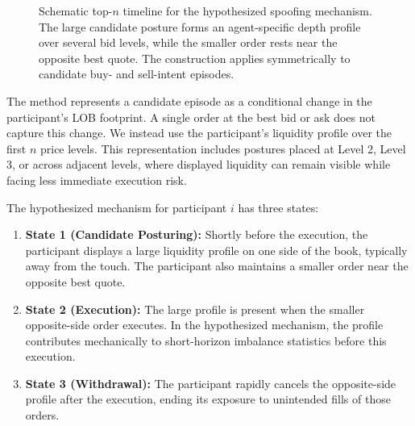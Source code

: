 \documentclass[11pt]{article}
\begin{document}
\begin{figure}[htbp]
{%
    }
    \caption{Schematic top-$n$ timeline for the hypothesized spoofing mechanism. The large candidate posture forms an
    agent-specific depth profile over several bid levels, while the smaller order rests near the opposite best quote. The
    construction applies symmetrically to candidate buy- and sell-intent episodes.}
    \label{fig:topn_spoofing_timeline}
\end{figure}

The method represents a candidate episode as a conditional change in the participant's LOB footprint. A single order at
the best bid or ask does not capture this change. We instead use the participant's liquidity profile over the first $n$
price levels. This representation includes postures placed at Level 2, Level 3, or across adjacent levels, where displayed
liquidity can remain visible while facing less immediate execution risk.

The hypothesized mechanism for participant $i$ has three states:
\begin{enumerate}
    \item \textbf{State 1 (Candidate Posturing):} Shortly before the execution, the participant displays a large
    liquidity profile on one side of the book, typically away from the touch. The participant also maintains a smaller
    order near the opposite best quote.
    \item \textbf{State 2 (Execution):} The large profile is present when the smaller opposite-side order executes. In the
    hypothesized mechanism, the profile contributes mechanically to short-horizon imbalance statistics before this
    execution.
    \item \textbf{State 3 (Withdrawal):} The participant rapidly cancels the opposite-side profile after the execution,
    ending its exposure to unintended fills of those orders.
\end{enumerate}
\end{document}

